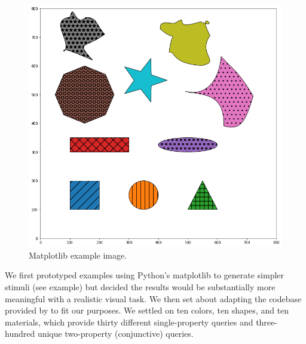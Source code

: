 \begin{figure}
\vspace{-.4in}
\begin{spacing}{1.0}
\centering
\includegraphics[width=.95\linewidth]{ch-dataset-task-benchmark/figures/dataset/matplotlib_image.png}
\caption{Matplotlib example image.}
\label{fig:dataset-matplotlib-image}
\end{spacing}
\end{figure}

We first prototyped examples using Python’s matplotlib \parencite{Hunter2007} to generate simpler stimuli (see example) but decided the results would be substantially more meaningful with a realistic visual task. We then set about adapting the codebase provided by \textcite{Johnson2017} to fit our purposes. We settled on ten colors, ten shapes, and ten materials, which provide thirty different single-property queries and three-hundred unique two-property (conjunctive) queries. 

